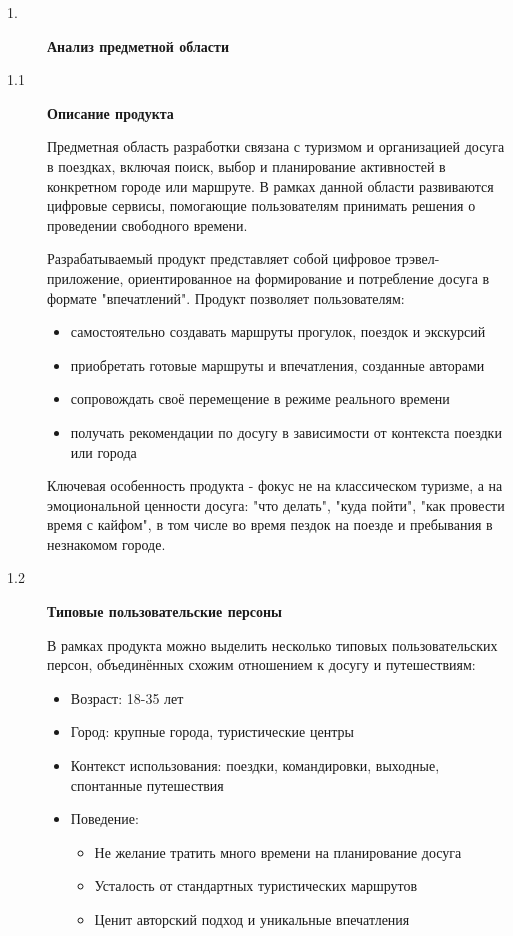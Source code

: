 \documentclass[a4paper]{article}
\begin{document}
\begin{description}
    \item[\Large1.] \Large \textbf{Анализ предметной области}
    \item[\large1.1] \large \textbf{Описание продукта}
    
    \normalsize Предметная область разработки связана с туризмом и организацией досуга в поездках, включая поиск, выбор и планирование активностей в конкретном городе или маршруте. В рамках данной области развиваются цифровые сервисы, помогающие пользователям принимать решения о проведении свободного времени.

    Разрабатываемый продукт представляет собой цифровое трэвел-приложение, ориентированное на формирование и потребление досуга в формате "впечатлений". Продукт позволяет пользователям:

    \begin{itemize}[label=$-$]
        \item самостоятельно создавать маршруты прогулок, поездок и экскурсий
        \item приобретать готовые маршруты и впечатления, созданные авторами
        \item сопровождать своё перемещение в режиме реального времени
        \item получать рекомендации по досугу в зависимости от контекста поездки или города
    \end{itemize}

    Ключевая особенность продукта - фокус не на классическом туризме, а на эмоциональной ценности досуга: "что делать", "куда пойти", "как провести время с кайфом", в том числе во время пездок на поезде и пребывания в незнакомом городе.

    \item[\large1.2] \large \textbf{Типовые пользовательские персоны}
    
    \normalsize В рамках продукта можно выделить несколько типовых пользовательских персон, объединённых схожим отношением к досугу и путешествиям:

    \begin{itemize}[label=$-$]
        \item Возраст: 18-35 лет
        \item Город: крупные города, туристические центры
        \item Контекст использования: поездки, командировки, выходные, спонтанные путешествия
        \item Поведение: \begin{itemize}[label=$\circ$]
            \item Не желание тратить много времени на планирование досуга
            \item Усталость от стандартных туристических маршрутов
            \item Ценит авторский подход и уникальные впечатления
        \end{itemize}
    \end{itemize}


\end{description}
\end{document}
